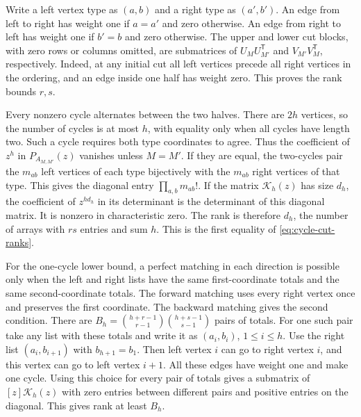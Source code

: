 \documentclass[11pt,reqno]{amsart}
\theoremstyle{remark}
\numberwithin{equation}{section}
\begin{document}
Write a left vertex type as \((a,b)\) and a right type as \((a',b')\). An
edge from left to right has weight one if \(a=a'\) and zero otherwise. An
edge from right to left has weight one if \(b'=b\) and zero otherwise.
The upper and lower cut blocks, with zero rows or columns omitted, are
submatrices of \(U_MU_{M'}^{\mathsf T}\) and \(V_{M'}V_M^{\mathsf T}\),
respectively. Indeed, at any initial cut all left vertices precede all
right vertices in the ordering, and an edge inside one half has weight
zero. This proves the rank bounds \(r,s\).

Every nonzero cycle alternates between the two halves. There are \(2h\)
vertices, so the number of cycles is at most \(h\), with equality only
when all cycles have length two. Such a cycle requires both type
coordinates to agree. Thus the coefficient of \(z^h\) in
\(P_{A_{M,M'}}(z)\) vanishes unless \(M=M'\). If they are equal, the
two-cycles pair the \(m_{ab}\) left vertices of each type bijectively
with the \(m_{ab}\) right vertices of that type. This gives the diagonal
entry \(\prod_{a,b}m_{ab}!\). If the matrix \(\mathcal K_h(z)\) has size
\(d_h\), the coefficient of \(z^{h d_h}\) in its determinant is the
determinant of this diagonal matrix. It is nonzero in characteristic
zero. The rank is therefore \(d_h\), the number of arrays with \(rs\)
entries and sum \(h\). This is the first equality of
\eqref{eq:cycle-cut-ranks}.

For the one-cycle lower bound, a perfect matching in each direction is
possible only when the left and right lists have the same
first-coordinate totals and the same second-coordinate totals. The
forward matching uses every right vertex once and preserves the first
coordinate. The backward matching gives the second condition. There are
\(B_h=\binom{h+r-1}{r-1}\binom{h+s-1}{s-1}\) pairs of totals. For one
such pair take any list with these totals and write it as \((a_i,b_i)\),
\(1\le i\le h\). Use the right list \((a_i,b_{i+1})\) with
\(b_{h+1}=b_1\). Then left vertex \(i\) can go to right vertex \(i\), and
this vertex can go to left vertex \(i+1\). All these edges have weight
one and make one cycle. Using this choice for every pair of totals gives
a submatrix of \([z]\mathcal K_h(z)\) with zero entries between different
pairs and positive entries on the diagonal. This gives rank at least
\(B_h\).
\end{document}
